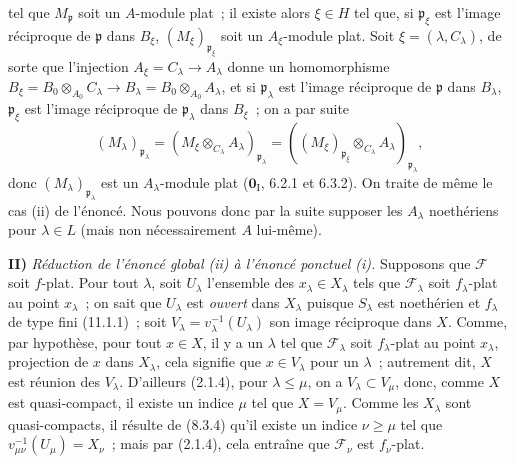tel que $M_{\mathfrak p}$ soit un $A$-module plat~; il existe alors
$\xi\in H$ tel que, si $\mathfrak p_\xi$ est l'image réciproque de
$\mathfrak p$ dans $B_\xi$, $(M_\xi)_{\mathfrak p_\xi}$ soit un
$A_\xi$-module plat. Soit $\xi=(\lambda,C_\lambda)$, de sorte que
l'injection $A_\xi=C_\lambda\to A_\lambda$ donne un homomorphisme
$B_\xi=B_0\otimes_{A_0}C_\lambda\to B_\lambda=B_0\otimes_{A_0}A_\lambda$,
et si $\mathfrak p_\lambda$ est l'image réciproque de $\mathfrak p$ dans
$B_\lambda$, $\mathfrak p_\xi$ est l'image réciproque de
$\mathfrak p_\lambda$ dans $B_\xi$~; on a par suite
\[
(M_\lambda)_{\mathfrak p_\lambda}
=(M_\xi\otimes_{C_\lambda}A_\lambda)_{\mathfrak p_\lambda}
=((M_\xi)_{\mathfrak p_\xi}\otimes_{C_\lambda}A_\lambda)_{\mathfrak p_\lambda},
\]
donc $(M_\lambda)_{\mathfrak p_\lambda}$ est un $A_\lambda$-module plat
($\mathbf 0_{\mathrm I}$, 6.2.1 et 6.3.2). On traite de même le cas (ii) de
l'énoncé. Nous pouvons donc par la suite supposer les $A_\lambda$
noethériens pour $\lambda\in L$ (mais non nécessairement $A$ lui-même).

\medskip
\noindent\textbf{II)} \emph{Réduction de l'énoncé global (ii) à l'énoncé
ponctuel (i).} Supposons que $\mathcal F$ soit $f$-plat. Pour tout $\lambda$,
soit $U_\lambda$ l'ensemble des $x_\lambda\in X_\lambda$ tels que
$\mathcal F_\lambda$ soit $f_\lambda$-plat au point $x_\lambda$~; on sait
que $U_\lambda$ est \emph{ouvert} dans $X_\lambda$ puisque $S_\lambda$ est
noethérien et $f_\lambda$ de type fini (11.1.1)~; soit
$V_\lambda=v_\lambda^{-1}(U_\lambda)$ son image réciproque dans $X$. Comme,
par hypothèse, pour tout $x\in X$, il y a un $\lambda$ tel que
$\mathcal F_\lambda$ soit $f_\lambda$-plat au point $x_\lambda$, projection
de $x$ dans $X_\lambda$, cela signifie que $x\in V_\lambda$ pour un
$\lambda$~; autrement dit, $X$ est réunion des $V_\lambda$. D'ailleurs
(2.1.4), pour $\lambda\leq\mu$, on a $V_\lambda\subset V_\mu$, donc, comme
$X$ est quasi-compact, il existe un indice $\mu$ tel que $X=V_\mu$. Comme
les $X_\lambda$ sont quasi-compacts, il résulte de (8.3.4) qu'il existe un
indice $\nu\geq\mu$ tel que $v_{\mu\nu}^{-1}(U_\mu)=X_\nu$~; mais par
(2.1.4), cela entraîne que $\mathcal F_\nu$ est $f_\nu$-plat.

